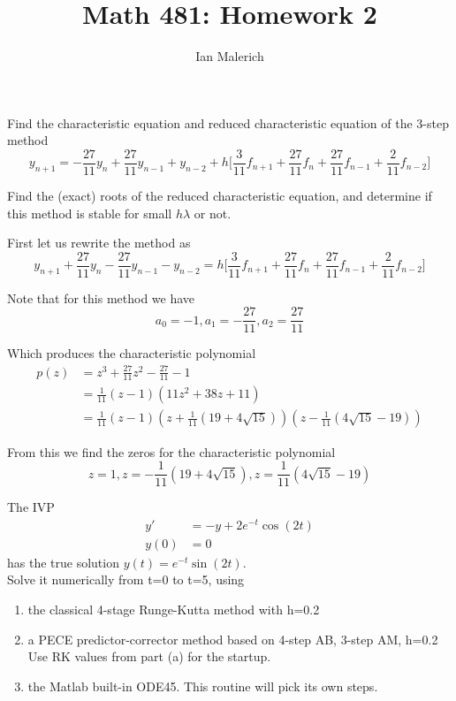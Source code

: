 \documentclass{jhwhw}
\author{Ian Malerich}
\title{Math 481: Homework 2}
\begin{document}
\raggedright

\problem{}

    Find the characteristic equation and reduced characteristic equation of the 3-step method
    $$
	y_{n+1} = -\frac{27}{11}y_n + \frac{27}{11}y_{n-1} + y_{n-2} + 
	h\biggr[\frac{3}{11}f_{n+1} + \frac{27}{11}f_n + \frac{27}{11}f_{n-1} + \frac{2}{11}f_{n-2}\biggr]
    $$

    Find the (exact) roots of the reduced characteristic equation, and determine if this method
    is stable for small $h\lambda$ or not.

\solution
    
    First let us rewrite the method as
    $$
	y_{n+1} + \frac{27}{11}y_n - \frac{27}{11}y_{n-1} - y_{n-2} =
	h\biggr[\frac{3}{11}f_{n+1} + \frac{27}{11}f_n + \frac{27}{11}f_{n-1} + \frac{2}{11}f_{n-2}\biggr]
    $$

    Note that for this method we have 
    $$
	a_0 = -1, a_1 = -\frac{27}{11}, a_2 = \frac{27}{11}
    $$

    Which produces the characteristic polynomial
    \begin{align*}
	p(z) &= z^3 + \frac{27}{11}z^2 - \frac{27}{11} - 1 \\
	&= \frac{1}{11}(z-1)(11z^2 + 38z+11) \\
	&= \frac{1}{11}(z-1)
	    (z + \frac{1}{11}(19 + 4\sqrt{15}))
	    (z - \frac{1}{11}(4\sqrt{15} - 19))
    \end{align*}

    From this we find the zeros for the characteristic polynomial
    $$
	z = 1,
	z = -\frac{1}{11}(19 + 4\sqrt{15}),
	z = \frac{1}{11}(4\sqrt{15} - 19)
    $$

\problem{}

    The IVP
    \begin{align*}
	y' &= -y + 2e^{-t}\cos(2t) \\
	y(0) &= 0
    \end{align*}
    has the true solution $y(t) = e^{-t}\sin(2t)$. \\
    Solve it numerically from t=0 to t=5, using
    \begin{enumerate}
	\item the classical 4-stage Runge-Kutta method with h=0.2
	\item a PECE predictor-corrector method based on 4-step AB, 3-step AM, h=0.2 \\
	    Use RK values from part (a) for the startup.
	\item the Matlab built-in ODE45. This routine will pick its own steps.
    \end{enumerate}
\end{document}
